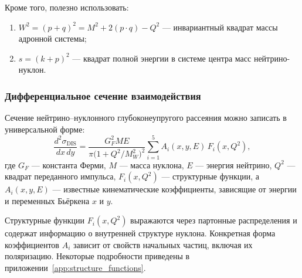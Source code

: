 Кроме того, полезно использовать:
\begin{enumerate}
  \item \( W^2 = (p + q)^2 = M^2 + 2(p \cdot q) - Q^2 \) — инвариантный квадрат массы адронной системы;
  \item \( s = (k + p)^2 \) — квадрат полной энергии в системе центра масс нейтрино-нуклон.
\end{enumerate}

\subsubsection{Дифференциальное сечение взаимодействия}

Сечение нейтрино–нуклонного глубоконеупругого рассеяния можно записать в универсальной форме:
\begin{equation}
  \frac{d^2 \sigma_{\text{DIS}}}{dx\,dy} =
  \frac{G_F^2 M E}{\pi \bigl(1 + Q^2/M_W^2\bigr)^2}
  \sum_{i=1}^{5} A_i(x, y, E)\, F_i(x, Q^2),
  \label{eq:xsec_general}
\end{equation}
где \( G_F \) — константа Ферми, \( M \) — масса нуклона, \( E \) — энергия нейтрино, \( Q^2 \) — квадрат переданного импульса, \( F_i(x, Q^2) \) — структурные функции, а \( A_i(x, y, E) \) — известные кинематические коэффициенты, зависящие от энергии и переменных Бьёркена \( x \) и \( y \).

Структурные функции \( F_i(x, Q^2) \) выражаются через партонные распределения и содержат информацию о внутренней структуре нуклона. Конкретная форма коэффициентов \( A_i \) зависит от свойств начальных частиц, включая их поляризацию. Некоторые подробности приведены в приложении~\ref{app:structure_functions}.
